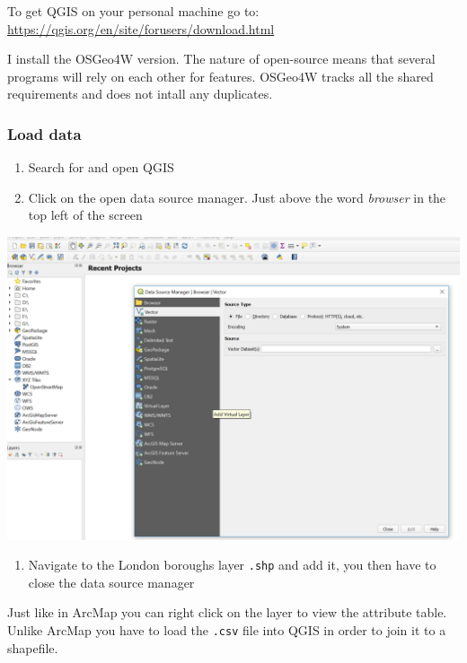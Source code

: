 \documentclass[]{book}
\providecommand{\tightlist}{%
  \setlength{\itemsep}{0pt}\setlength{\parskip}{0pt}}
\begin{document}
To get QGIS on your personal machine go to: \url{https://qgis.org/en/site/forusers/download.html}

I install the OSGeo4W version. The nature of open-source means that several programs will rely on each other for features. OSGeo4W tracks all the shared requirements and does not intall any duplicates.

\hypertarget{load-data-1}{%
\subsubsection{Load data}\label{load-data-1}}

\begin{enumerate}
\def\labelenumi{\arabic{enumi}.}
\tightlist
\item
  Search for and open QGIS
\item
  Click on the open data source manager. Just above the word \emph{browser} in the top left of the screen
\end{enumerate}

\begin{center}\includegraphics[width=700pt]{prac1_images/qgis_datamanager} \end{center}

\begin{enumerate}
\def\labelenumi{\arabic{enumi}.}
\setcounter{enumi}{2}
\tightlist
\item
  Navigate to the London boroughs layer \texttt{.shp} and add it, you then have to close the data source manager
\end{enumerate}

Just like in ArcMap you can right click on the layer to view the attribute table. Unlike ArcMap you have to load the \texttt{.csv} file into QGIS in order to join it to a shapefile.
\end{document}

